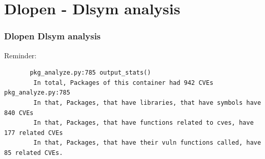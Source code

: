 \section{Dlopen - Dlsym analysis}
\begin{frame}[fragile]
  \frametitle{Dlopen Dlsym analysis}
  Reminder:
  \small
    \begin{verbatim}
       pkg_analyze.py:785 output_stats() 
        In total, Packages of this container had 942 CVEs         pkg_analyze.py:785
        In that, Packages, that have libraries, that have symbols have 840 CVEs                                                
        In that, Packages, that have functions related to cves, have 177 related CVEs                                          
        In that, Packages, that have their vuln functions called, have 85 related CVEs.  
    \end{verbatim}
    \normal
\end{frame}

\begin{frame}[fragile]
\end{frame}

